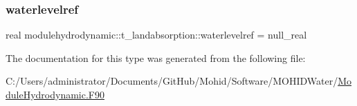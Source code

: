 \mbox{\label{structmodulehydrodynamic_1_1t__landabsorption_a3c4ae8860b51f49531839eaa648c79e1}} 
\subsubsection{\texorpdfstring{waterlevelref}{waterlevelref}}
{\footnotesize\ttfamily real modulehydrodynamic\+::t\+\_\+landabsorption\+::waterlevelref = null\+\_\+real\hspace{0.3cm}{\ttfamily [private]}}



The documentation for this type was generated from the following file\+:\begin{DoxyCompactItemize}
\item 
C\+:/\+Users/administrator/\+Documents/\+Git\+Hub/\+Mohid/\+Software/\+M\+O\+H\+I\+D\+Water/\mbox{\hyperlink{_module_hydrodynamic_8_f90}{Module\+Hydrodynamic.\+F90}}\end{DoxyCompactItemize}
